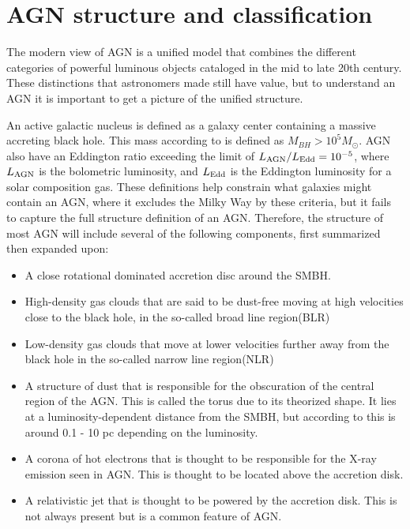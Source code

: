 \section{AGN structure and classification}


The modern view of AGN is a unified model that combines the different categories of powerful luminous objects cataloged in the mid to late 20th century. 
These distinctions that astronomers made still
have value, but to understand an AGN it is important to get a picture of the unified structure.

An active galactic nucleus is defined as a galaxy center containing a massive accreting black hole. This mass according to \cite{Netzer_2015} 
is defined as $M_{BH} > 10^5 M_\odot$. AGN also have an Eddington ratio exceeding
the limit of $L_{\rm AGN}/ L_{\rm Edd} = 10^{-5}$, where $L_{\rm AGN}$ is the bolometric luminosity, and $L_{\rm Edd}$ is the Eddington luminosity for a solar 
composition gas. These definitions help constrain what galaxies might contain an AGN, where it excludes the Milky Way 
by these criteria, but it fails to capture the full structure definition of an AGN. 
Therefore, the structure of most AGN will include several of the following components, first summarized then expanded upon: 


\begin{itemize}
    \item A close rotational dominated accretion disc around the SMBH. %
   \item High-density gas clouds that are said to be dust-free moving at high velocities close to the black hole, in the so-called broad line region(BLR)
    \item Low-density gas clouds that move at lower velocities further away from the black hole in the so-called narrow line region(NLR)
    \item A structure of dust that is responsible for the obscuration of the central region of the AGN. This is called the torus due to its theorized shape. 
     It lies at a luminosity-dependent distance from the SMBH, but according to \cite{Netzer_2015} this is around 0.1 - 10 pc depending on the luminosity.
    \item A corona of hot electrons that is thought to be responsible for the X-ray emission seen in AGN. This is thought to be located above the accretion disk. 
    \item A relativistic jet that is thought to be powered by the accretion disk. This is not always present but is a common feature of AGN.
\end{itemize}

